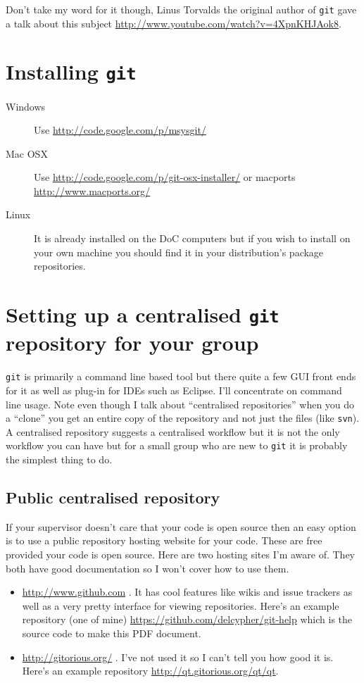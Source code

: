 \documentclass[a4paper,10pt,fleqn]{article}
\begin{document}
	Don't take my word for it though, Linus Torvalds the original author of \texttt{git} gave a talk about this subject \url{http://www.youtube.com/watch?v=4XpnKHJAok8}.

\section{Installing \texttt{git}}
	\begin{description}
	 \item[Windows] Use \url{http://code.google.com/p/msysgit/}
	 \item[Mac OSX] Use \url{http://code.google.com/p/git-osx-installer/} or macports \url{http://www.macports.org/}
	 \item[Linux] It is already installed on the DoC computers but if you wish to install on your own machine you should find it in your distribution's package repositories.	
	\end{description}


\section{Setting up a centralised \texttt{git} repository for your group}
\texttt{git} is primarily a command line based tool but there quite a few GUI front ends for it as well as plug-in for IDEs such as Eclipse. I'll concentrate on command line usage. Note even though I talk about ``centralised repositories'' when you do a ``clone'' you get an entire copy of the repository and not just the files (like \texttt{svn}). A centralised repository suggests a centralised workflow but it is not the only workflow you can have but for a small group who are new to \texttt{git} it is probably the simplest thing to do.

		\subsection{Public centralised repository}
		If your supervisor doesn't care that your code is open source then an easy option is to use a public repository hosting website for your code. These are free provided your code is open source. Here are two hosting sites I'm aware of. They both have good documentation so I won't cover how to use them.
		\begin{itemize}
			\item \url{http://www.github.com} . It has cool features like wikis and issue trackers as well as a very pretty interface for viewing repositories. Here's an example repository (one of mine) \url{https://github.com/delcypher/git-help} which is the source code to make this PDF document.
			\item \url{http://gitorious.org/} . I've not used it so I can't tell you how good it is. Here's an example repository \url{http://qt.gitorious.org/qt/qt}.
		\end{itemize}
\end{document}
